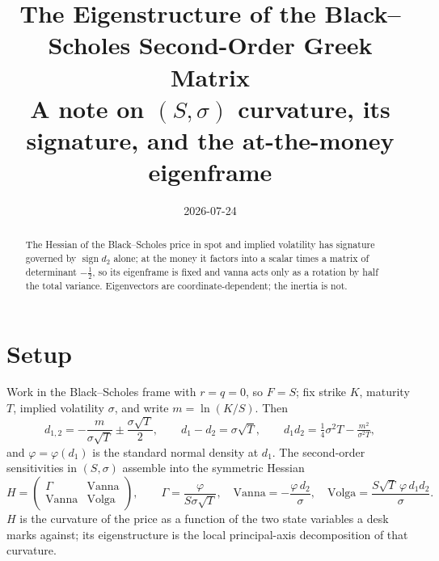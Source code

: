 \documentclass[11pt]{article}
\title{\vspace{-3.5em}The Eigenstructure of the Black--Scholes Second-Order Greek Matrix\\[2pt]
\large A note on $(S,\sigma)$ curvature, its signature, and the at-the-money eigenframe}
\author{}
\date{2026-07-24}
\begin{document}
\maketitle
\vspace{-3.2em}

\begin{abstract}
\noindent The Hessian of the Black--Scholes price in spot and implied volatility has
signature governed by $\operatorname{sign} d_2$ alone; at the money it factors into a
scalar times a matrix of determinant $-\tfrac12$, so its eigenframe is fixed and vanna
acts only as a rotation by half the total variance. Eigenvectors are coordinate-dependent;
the inertia is not.
\end{abstract}

\vspace{-0.4em}
\section{Setup}
Work in the Black--Scholes frame with $r=q=0$, so $F=S$; fix strike $K$, maturity $T$, implied
volatility $\sigma$, and write $m=\ln(K/S)$. Then
\[
d_{1,2}=-\frac{m}{\sigma\sqrt T}\pm\frac{\sigma\sqrt T}{2},\qquad
d_1-d_2=\sigma\sqrt T,\qquad d_1 d_2=\tfrac14\sigma^2T-\tfrac{m^2}{\sigma^2T},
\]
and $\varphi=\varphi(d_1)$ is the standard normal density at $d_1$. The second-order sensitivities
in $(S,\sigma)$ assemble into the symmetric Hessian
\[
H=\begin{pmatrix}\Gamma&\text{Vanna}\\[1pt]\text{Vanna}&\text{Volga}\end{pmatrix},\qquad
\Gamma=\frac{\varphi}{S\sigma\sqrt T},\quad
\text{Vanna}=-\frac{\varphi\,d_2}{\sigma},\quad
\text{Volga}=\frac{S\sqrt T\,\varphi\,d_1 d_2}{\sigma}.
\]
$H$ is the curvature of the price as a function of the two state variables a desk marks against;
its eigenstructure is the local principal-axis decomposition of that curvature.
\end{document}
